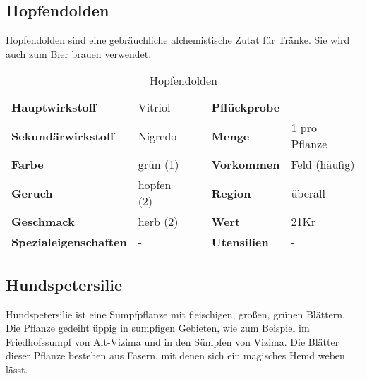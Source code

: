 \subsection{Hopfendolden}
Hopfendolden sind eine gebräuchliche alchemistische Zutat für Tränke. Sie wird auch zum Bier brauen verwendet.

\begin{table}[h] 
\begin{center} 
\begin{tabular}{|l|l|p{1cm}|l|l|} 
  	\cline{1-2} \cline{4-5} 
  	\textbf{Hauptwirkstoff} & Vitriol && \textbf{Pflückprobe} & - \\ \cline{1-2} \cline{4-5} 
  	\textbf{Sekundärwirkstoff} & Nigredo && \textbf{Menge} & 1 pro Pflanze \\ \cline{1-2} \cline{4-5} 
  	\textbf{Farbe} & grün (1) && \textbf{Vorkommen} & Feld (häufig) \\ \cline{1-2} \cline{4-5} 
  	\textbf{Geruch} & hopfen (2) && \textbf{Region} & überall \\ \cline{1-2} \cline{4-5} 
  	\textbf{Geschmack} & herb (2) && \textbf{Wert} & 21Kr \\ \cline{1-2} \cline{4-5} 
  	\textbf{Spezialeigenschaften} & - && \textbf{Utensilien} & - \\ \cline{1-2} \cline{4-5} 
\end{tabular} 
\end{center} 
\caption{Hopfendolden} 
\label{tab:hopfendolden} 
\end{table}


\subsection{Hundspetersilie}
Hundspetersilie ist eine Sumpfpflanze mit fleischigen, großen, grünen Blättern. Die Pflanze gedeiht üppig in sumpfigen Gebieten, wie zum Beispiel im Friedhofssumpf von Alt-Vizima und in den Sümpfen von Vizima. Die Blätter dieser Pflanze bestehen aus Fasern, mit denen sich ein magisches Hemd weben lässt. 

